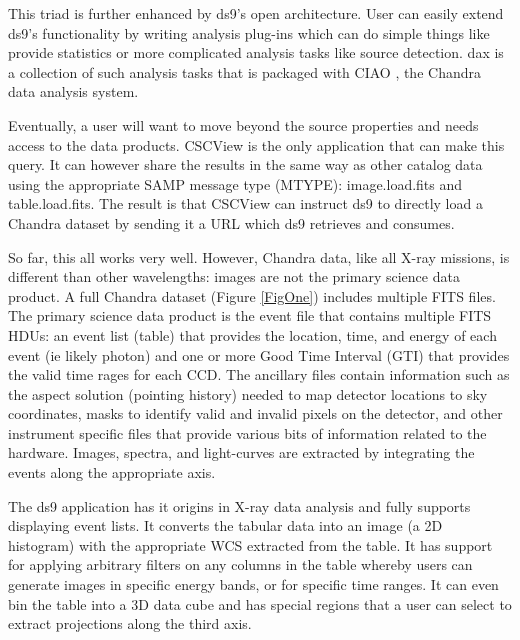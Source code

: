  This triad is further enhanced by ds9's open architecture.  User can easily extend ds9's functionality by writing analysis plug-ins which can do simple things like provide statistics or more complicated analysis tasks like source detection.  dax \citep{2011ASPC..442..629G} is a collection of such analysis tasks that is packaged with CIAO \citep{2006SPIE.6270E..60F}, the Chandra data analysis system.


Eventually, a user will want to move beyond the source properties and needs access to the data products.  CSCView is the only application that can make this query.  It can however share the results in the same way as other catalog data using the appropriate SAMP message type (MTYPE): image.load.fits and table.load.fits. The result is that CSCView can instruct ds9 to directly load a Chandra dataset by sending it a URL which ds9 retrieves and consumes.



So far, this all works very well.  However, Chandra data, like all X-ray missions, is different than other wavelengths:  images are not the primary science data product. A full Chandra  dataset (Figure \ref{FigOne}) includes multiple FITS files. The primary science data product is the event file that contains multiple FITS HDUs:  an event list (table) that provides the location, time, and energy of each event (ie likely photon) and one or more Good Time Interval (GTI) that provides the valid time rages for each CCD.  The ancillary files contain information such as the aspect solution (pointing history) needed to map detector locations to sky coordinates, masks to identify valid and invalid pixels on the detector, and other instrument specific files that provide various bits of information related to the hardware.  Images, spectra, and light-curves are extracted by integrating the events along the appropriate axis.

The ds9 application has it origins in X-ray data analysis and fully supports displaying event lists.  It converts the tabular data into an image (a 2D histogram) with the appropriate WCS extracted from the table. It has support for applying arbitrary filters on any columns in the table whereby users can generate images in specific energy bands, or for specific time ranges.  It can even bin the table into a 3D data cube and has special regions that a user can select to extract projections along the third axis.

